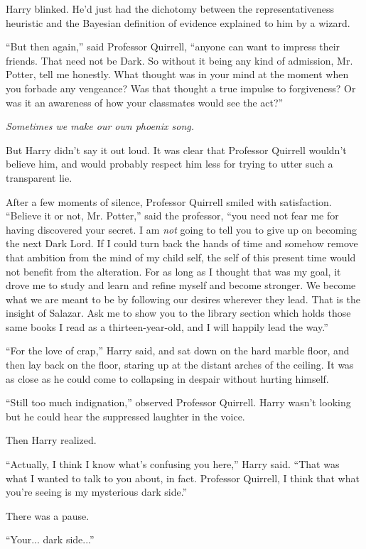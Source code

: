 Harry blinked. He'd just had the dichotomy between the representativeness heuristic and the Bayesian definition of evidence explained to him by a wizard.

``But then again,'' said Professor Quirrell, ``anyone can want to impress their friends. That need not be Dark. So without it being any kind of admission, Mr. Potter, tell me honestly. What thought was in your mind at the moment when you forbade any vengeance? Was that thought a true impulse to forgiveness? Or was it an awareness of how your classmates would see the act?''

\emph{Sometimes we make our own phoenix song.}

But Harry didn't say it out loud. It was clear that Professor Quirrell wouldn't believe him, and would probably respect him less for trying to utter such a transparent lie.

After a few moments of silence, Professor Quirrell smiled with satisfaction. ``Believe it or not, Mr. Potter,'' said the professor, ``you need not fear me for having discovered your secret. I am \emph{not} going to tell you to give up on becoming the next Dark Lord. If I could turn back the hands of time and somehow remove that ambition from the mind of my child self, the self of this present time would not benefit from the alteration. For as long as I thought that was my goal, it drove me to study and learn and refine myself and become stronger. We become what we are meant to be by following our desires wherever they lead. That is the insight of Salazar. Ask me to show you to the library section which holds those same books I read as a thirteen-year-old, and I will happily lead the way.''

``For the love of crap,'' Harry said, and sat down on the hard marble floor, and then lay back on the floor, staring up at the distant arches of the ceiling. It was as close as he could come to collapsing in despair without hurting himself.

``Still too much indignation,'' observed Professor Quirrell. Harry wasn't looking but he could hear the suppressed laughter in the voice.

Then Harry realized.

``Actually, I think I know what's confusing you here,'' Harry said. ``That was what I wanted to talk to you about, in fact. Professor Quirrell, I think that what you're seeing is my mysterious dark side.''

There was a pause.

``Your... dark side...''

